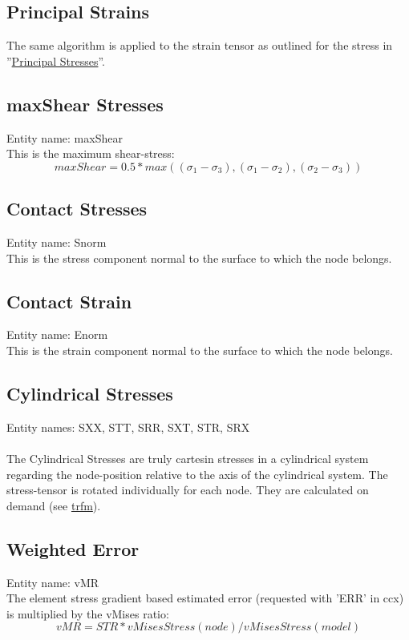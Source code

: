 \documentclass{article}
\providecommand{\htmlref}[2]{\hyperref[#2]{#1}}
\begin{document}
\subsection{\label{Principal Strains}Principal Strains}
The same algorithm is applied to the strain tensor as outlined for the stress in ''\htmlref{Principal Stresses}{Principal Stresses}''.

\subsection{\label{maxShear Stress}maxShear Stresses}
Entity name: maxShear\\
This is the maximum shear-stress:
\[ maxShear = 0.5 * max( (\sigma_{1} - \sigma_{3}),(\sigma_{1} - \sigma_{2}),(\sigma_{2} - \sigma_{3}) )\]

\subsection{\label{Contact Stress}Contact Stresses}
Entity name: Snorm\\
This is the stress component normal to the surface to which the node belongs.

\subsection{\label{Contact Strain}Contact Strain}
Entity name: Enorm\\
This is the strain component normal to the surface to which the node belongs.

\subsection{\label{Cylindrical Stresses}Cylindrical Stresses}
Entity names: SXX, STT, SRR, SXT, STR, SRX\\\\
The Cylindrical Stresses are truly cartesin stresses in a cylindrical system regarding the node-position relative to the axis of the cylindrical system. The stress-tensor is rotated individually for each node. They are calculated on demand (see \htmlref{trfm}{trfm}).

\subsection{\label{Weighted Error}Weighted Error}
Entity name: vMR\\
The element stress gradient based estimated error (requested with 'ERR' in
ccx) is multiplied by the vMises ratio:
\[ vMR = STR * vMisesStress(node) / vMisesStress(model)\]
\end{document}
